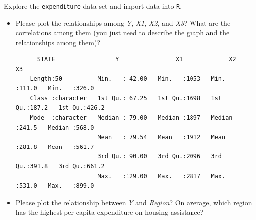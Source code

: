 \documentclass[12pt,letterpaper]{article}
\begin{document}
\vspace{.5cm}
\noindent Explore the \texttt{expenditure} data set and import data into \texttt{R}.
\vspace{.5cm}
  
\vspace{.5cm}
\begin{itemize}

\item
Please plot the relationships among \emph{Y}, \emph{X1}, \emph{X2}, and \emph{X3}? What are the correlations among them (you just need to describe the graph and the relationships among them)?


	\begin{verbatim}
	  STATE                 Y                X1             X2              X3       
	Length:50          Min.   : 42.00   Min.   :1053   Min.   :111.0   Min.   :326.0  
	Class :character   1st Qu.: 67.25   1st Qu.:1698   1st Qu.:187.2   1st Qu.:426.2  
	Mode  :character   Median : 79.00   Median :1897   Median :241.5   Median :568.0  
	                   Mean   : 79.54   Mean   :1912   Mean   :281.8   Mean   :561.7  
	                   3rd Qu.: 90.00   3rd Qu.:2096   3rd Qu.:391.8   3rd Qu.:661.2  
	                   Max.   :129.00   Max.   :2817   Max.   :531.0   Max.   :899.0 
  \end{verbatim} 
\vspace{.5cm}
\item
Please plot the relationship between \emph{Y} and \emph{Region}? On average, which region has the highest per capita expenditure on housing assistance?


\end{itemize}
\end{document}
